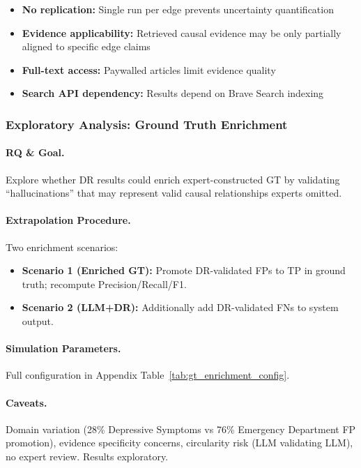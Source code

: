 \begin{itemize}[noitemsep]
    \item \textbf{No replication:} Single run per edge prevents uncertainty quantification
    \item \textbf{Evidence applicability:} Retrieved causal evidence may be only partially aligned to specific edge claims
    \item \textbf{Full-text access:} Paywalled articles limit evidence quality
    \item \textbf{Search API dependency:} Results depend on Brave Search indexing
\end{itemize}

\subsubsection{Exploratory Analysis: Ground Truth Enrichment}
\label{sec:gt_enrichment_method}

\paragraph{RQ \& Goal.}
Explore whether DR results could enrich expert-constructed GT by validating ``hallucinations'' that may represent valid causal relationships experts omitted.

\paragraph{Extrapolation Procedure.}
Two enrichment scenarios:
\begin{itemize}[noitemsep]
    \item \textbf{Scenario 1 (Enriched GT):} Promote DR-validated FPs to TP in ground truth; recompute Precision/Recall/F1.
    \item \textbf{Scenario 2 (LLM+DR):} Additionally add DR-validated FNs to system output.
\end{itemize}

\paragraph{Simulation Parameters.}
Full configuration in Appendix Table~\ref{tab:gt_enrichment_config}.

\paragraph{Caveats.}
Domain variation (28\% Depressive Symptoms vs 76\% Emergency Department FP promotion), evidence specificity concerns, circularity risk (LLM validating LLM), no expert review. Results exploratory.


